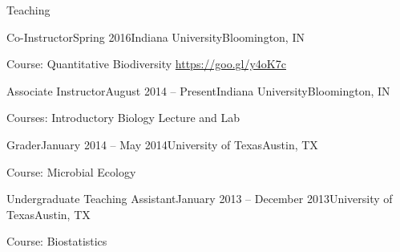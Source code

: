 \documentclass{resume} %
\begin{document}
\begin{rSection}{Teaching}

\begin{rSubsection}{Co-Instructor}{Spring 2016}{Indiana University}{Bloomington, IN}
\item Course: Quantitative Biodiversity \url{https://goo.gl/y4oK7c}
\end{rSubsection}

\begin{rSubsection}{Associate Instructor}{August 2014 -- Present}{Indiana University}{Bloomington, IN}
\item Courses: Introductory Biology Lecture and Lab
\end{rSubsection}

\begin{rSubsection}{Grader}{January 2014 -- May 2014}{University of Texas}{Austin, TX}
\item Course: Microbial Ecology
\end{rSubsection}

\begin{rSubsection}{Undergraduate Teaching Assistant}{January 2013 -- December 2013}{University of Texas}{Austin, TX}
\item Course: Biostatistics
\end{rSubsection}

\end{rSection}
\end{document}
